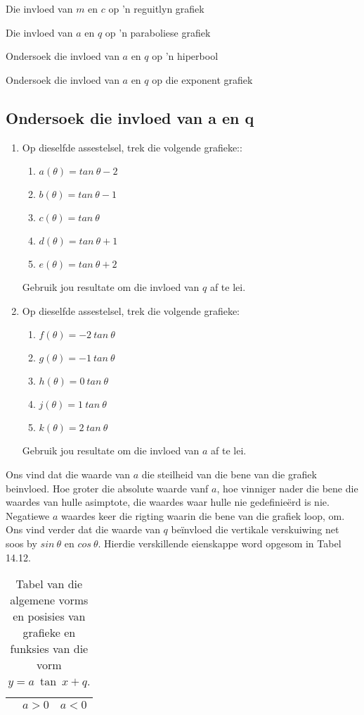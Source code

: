 \begin{Ondersoek}{Die invloed van $m$ en $c$ op 'n reguitlyn grafiek}
\begin{Ondersoek}{Die invloed van $a$ en $q$ op 'n paraboliese grafiek}
\begin{Ondersoek}{Ondersoek die invloed van $a$ en $q$ op 'n hiperbool}
\begin{Ondersoek}{Ondersoek die invloed van $a$ en $q$ op die exponent grafiek}
\subsection*{Ondersoek die invloed van a en q}
\nopagebreak
\begin{enumerate}[noitemsep, label=\textbf{\arabic*}. ] 
\item Op dieselfde assestelsel, trek die volgende grafieke::
\begin{enumerate}[noitemsep, label=\textbf{\alph*}. ] 
\item $a(\theta )=tan~\theta -2$
\item $b(\theta )=tan~\theta -1$
\item $c(\theta )=tan~\theta $
\item $d(\theta )=tan~\theta +1$
\item $e(\theta )=tan~\theta +2$\end{enumerate}
Gebruik jou resultate om die invloed van $q$ af te lei.
\item Op dieselfde assestelsel, trek die volgende grafieke:
\begin{enumerate}[noitemsep, label=\textbf{\alph*}. ] 
\item $f(\theta )=-2~tan~\theta $
\item $g(\theta )=-1~tan~\theta $
\item $h(\theta )=0~tan~\theta $
\item $j(\theta )=1~tan~\theta $
\item $k(\theta )=2~tan~\theta $\end{enumerate}
Gebruik jou resultate om die invloed van $a$ af te lei.
\end{enumerate}
Ons vind dat die waarde van $a$ die steilheid van die bene van die grafiek beinvloed. Hoe groter die absolute waarde vanf $a$, hoe vinniger nader die bene die waardes van hulle asimptote, die waardes waar hulle nie gedefinieërd is nie. Negatiewe $a$ waardes keer die rigting waarin die bene van die grafiek loop, om. Ons vind
verder dat die waarde van $q$ beïnvloed die vertikale verskuiwing net soos by $sin~\theta $ en $cos~\theta $.
Hierdie verskillende eienskappe word opgesom in Tabel 14.12.\par 
\begin{table}[htb]
\begin{center}
\caption{Tabel van die algemene vorms en posisies van grafieke en funksies van die vorm $y=a~ \tan~x + q$.}
\label{tab:mt:g:summarytan10}
\begin{tabular}{|c||c|c|}\hline
& $a>0$&$a<0$\\\hline\hline

\end{tabular}
\end{center}
\end{table}
\end{Ondersoek}
\end{Ondersoek}
\end{Ondersoek}
\end{Ondersoek}

